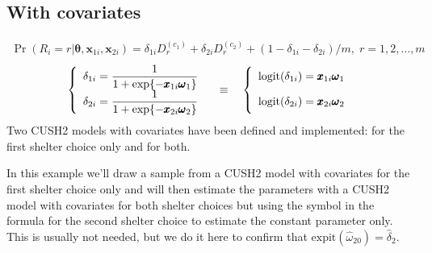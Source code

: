 \documentclass[letterpaper,10pt,english]{sphinxmanual}
\begin{document}
\subsection{With covariates}
\label{\detokenize{manual:cush2-with-covariates}}\label{\detokenize{manual:id26}}
\sphinxAtStartPar
{}

\sphinxAtStartPar
{}
\begin{equation*}
\begin{split}\Pr(R_i=r|\pmb\theta,\pmb x_{1i}, \pmb x_{2i}) = \delta_{1i} D_r^{(c_1)} + \delta_{2i} D_r^{(c_2)} + (1-\delta_{1i}- \delta_{2i})/m
,\; r=1,2,\ldots,m\end{split}
\end{equation*}\begin{equation*}
\begin{split}\left\{
\begin{array}{l}
    \delta_{1i} = \dfrac{1}{1+\exp\{ - \pmb x_{1i} \pmb\omega_1 \}}
    \\
    \delta_{2i} = \dfrac{1}{1+\exp\{ - \pmb x_{2i} \pmb\omega_2 \}}
\end{array}
\right.
\quad \equiv \quad
\left\{
\begin{array}{l}
    \mathrm{logit}(\delta_{1i}) = \pmb x_{1i} \pmb\omega_1
    \vphantom{\dfrac{1}{1+\exp\{ - \pmb x_{1i} \pmb\omega_1 \}}}
    \\
    \mathrm{logit}(\delta_{2i}) = \pmb x_{2i} \pmb\omega_2
    \vphantom{\dfrac{1}{1+\exp\{ - \pmb x_{2i} \pmb\omega_2 \}}}
\end{array}
\right.\end{split}
\end{equation*}
\sphinxAtStartPar
Two CUSH2 models with covariates have been defined and implemented:
for the first shelter choice only and for both.

\sphinxAtStartPar
In this example we’ll draw a sample from a CUSH2 model with
covariates for the first shelter choice only and will then
estimate the parameters with a CUSH2 model with covariates
for both shelter choices but using the symbol  in the
formula for the second shelter choice to estimate the
constant parameter only. This is usually not needed, but
we do it here to confirm that \(\mathrm{expit}(\hat\omega_{20})=\hat\delta_2\).
\end{document}
